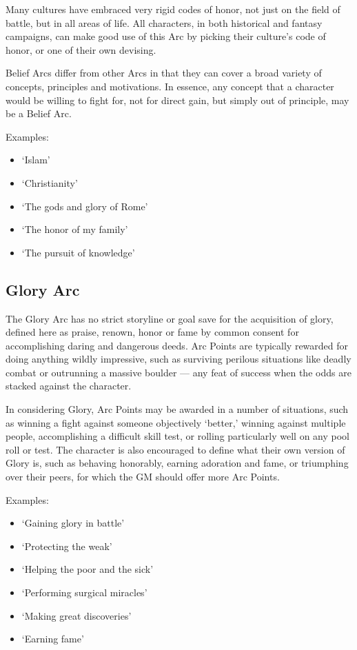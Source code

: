 \documentclass[oneside,11pt,english]{book}
\begin{document}
 
Many cultures have embraced very rigid codes of honor, not just on the field of battle, but in all areas of 
life. All characters, in both historical and fantasy campaigns, can make good use of this Arc by picking 
their culture’s code of honor, or one of their own devising. 

 
Belief Arcs differ from other Arcs in that they can cover a broad variety of concepts, principles and 
motivations. In essence, any concept that a character would be willing to fight for, not for direct gain, but 
simply out of principle, may be a Belief Arc. 
 

Examples: 
\begin{itemize}
\item ‘Islam’ 
\item ‘Christianity’ 
\item ‘The gods and glory of Rome’ 
\item ‘The honor of my family’ 
\item ‘The pursuit of knowledge’ 
\end{itemize}
 

\subsection{Glory Arc} 
The Glory Arc has no strict storyline or goal save for the acquisition of glory, defined here as praise, 
renown, honor or fame by common consent for accomplishing daring and dangerous deeds. Arc Points 
are typically rewarded for doing anything wildly impressive, such as surviving perilous situations like 
deadly combat or outrunning a massive boulder — any feat of success when the odds are stacked against 
the character. 

 
In considering Glory, Arc Points may be awarded in a number of situations, such as winning a fight 
against someone objectively ‘better,’ winning against multiple people, accomplishing a difficult skill test, 
or rolling particularly well on any pool roll or test. The character is also encouraged to define what their 
own version of Glory is, such as behaving honorably, earning adoration and fame, or triumphing over 
their peers, for which the GM should offer more Arc Points. 

 

Examples: 
\begin{itemize}
\item ‘Gaining glory in battle’ 
\item ‘Protecting the weak’ 
\item ‘Helping the poor and the sick’ 
\item ‘Performing surgical miracles’ 
\item ‘Making great discoveries’ 
\item ‘Earning fame’ 
\end{itemize}
 
\end{document}
